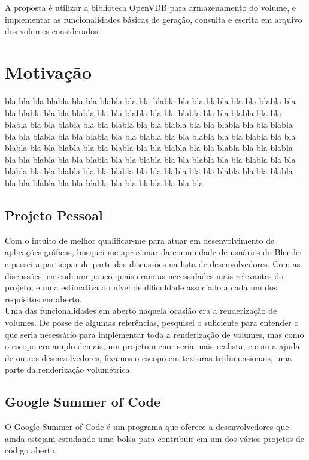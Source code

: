 A proposta é utilizar a biblioteca OpenVDB para armazenamento do volume, e implementar as funcionalidades básicas de geração, consulta e escrita em arquivo dos volumes considerados.

\section{Motivação}

bla bla bla blabla bla bla blabla bla bla blabla bla bla blabla bla bla blabla bla bla blabla bla bla blabla bla bla blabla bla bla blabla bla bla blabla bla bla blabla bla bla blabla bla bla blabla bla bla blabla bla bla blabla bla bla blabla bla bla blabla bla bla blabla bla bla blabla bla bla blabla bla bla blabla bla bla blabla bla bla blabla bla bla blabla bla bla blabla bla bla blabla bla bla blabla bla bla blabla bla bla blabla bla bla blabla bla bla blabla bla bla blabla bla bla blabla bla bla blabla bla bla blabla bla bla blabla bla bla blabla bla bla blabla bla bla blabla bla bla blabla bla bla blabla bla bla bla


\subsection*{Projeto Pessoal}
Com o intuito de melhor qualificar-me para atuar em desenvolvimento de aplicações gráficas, busquei me aproximar da comunidade de usuários do Blender e passei a participar de parte das discussões na lista de desenvolvedores. Com as discussões, entendi um pouco quais eram as necessidades mais relevantes do projeto, e uma estimativa do nível de dificuldade associado a cada um dos requisitos em aberto. \\

Uma das funcionalidades em aberto naquela ocasião era a renderização de volumes. De posse de algumas referências, pesquisei o suficiente para entender o que seria necessário para implementar toda a renderização de volumes, mas como o escopo era amplo demais, um projeto menor seria mais realista, e com a ajuda de outros desenvolvedores, fixamos o escopo em texturas tridimensionais, uma parte da renderização volumétrica. 

\subsection*{Google Summer of Code}
O Google Summer of Code é um programa que oferece a desenvolvedores que ainda estejam estudando uma bolsa para contribuir em um dos vários projetos de código aberto. \\

